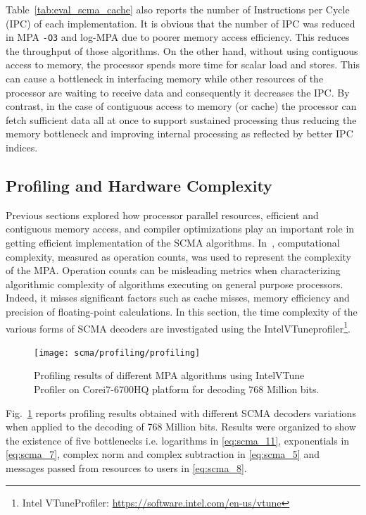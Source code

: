 Table~\ref{tab:eval_scma_cache} also reports the number of Instructions per
Cycle (IPC) of each implementation. It is obvious that the number of IPC was
reduced in MPA \verb|-O3| and log-MPA due to poorer memory access efficiency.
This reduces the throughput of those algorithms. On the other hand, without
using contiguous access to memory, the processor spends more time for scalar
load and stores. This can cause a bottleneck in interfacing memory while other
resources of the processor are waiting to receive data and consequently it
decreases the IPC. By contrast, in the case of contiguous access to memory (or
cache) the processor can fetch sufficient data all at once to support sustained
processing thus reducing the memory bottleneck and improving internal processing
as reflected by better IPC indices.

\subsection{Profiling and Hardware Complexity}
\label{sec:eval_scma_profiling}

Previous sections explored how processor parallel resources, efficient and
contiguous memory access, and compiler optimizations play an important role in
getting efficient implementation of the SCMA algorithms. In~\cite{Zhang2014a,
Liu2016,Jia2018,Du2016a}, computational complexity, measured as operation
counts, was used to represent the complexity of the MPA. Operation counts can be
misleading metrics when characterizing algorithmic complexity of algorithms
executing on general purpose processors. Indeed, it misses significant factors
such as cache misses, memory efficiency and precision of floating-point
calculations. In this section, the time complexity of the various forms of SCMA
decoders are investigated using the Intel\R VTune\TM profiler\footnote{Intel\R
VTune\TM Profiler: \url{https://software.intel.com/en-us/vtune}}.

\begin{figure}
  \centering
  \texttt{[image: scma/profiling/profiling]}
  \caption{Profiling results of different MPA algorithms using Intel\R VTune\TM
    Profiler on Core\TM i7-6700HQ platform for decoding 768 Million bits.}
  \label{plot:eval_scma_profiling}
\end{figure}

Fig.~\ref{plot:eval_scma_profiling} reports profiling results obtained with
different SCMA decoders variations when applied to the decoding of 768 Million
bits. Results were organized to show the existence of five bottlenecks i.e.
logarithms in \eqref{eq:scma_11}, exponentials in \eqref{eq:scma_7}, complex
norm and complex subtraction in \eqref{eq:scma_5} and messages passed from
resources to users in \eqref{eq:scma_8}.

